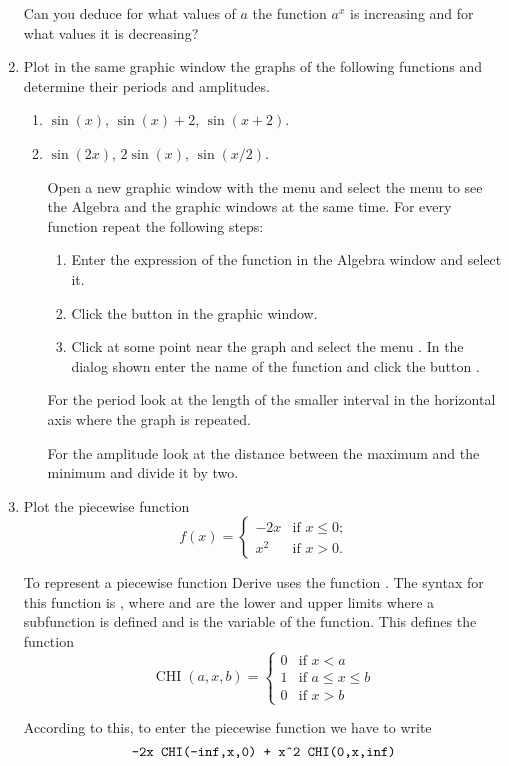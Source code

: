 \begin{enumerate}[leftmargin=*]
Can you deduce for what values of $a$ the function $a^x$ is increasing and for what values it is decreasing?


\item Plot in the same graphic window the graphs of the following functions and determine their periods and amplitudes. 
\begin{enumerate}
\item $\sin(x)$, $\sin(x)+2$, $\sin(x+2)$.
\item $\sin(2x)$, $2\sin(x)$, $\sin(x/2)$.
\begin{indication}
Open a new graphic window with the menu  and select the menu  to see the Algebra and the graphic windows at the same time. 
For every function repeat the following steps:
\begin{enumerate}
\item Enter the expression of the function in the Algebra window and select it. 
\item Click the button  in the graphic window.
\item Click at some point near the graph and select the menu . 
In the dialog shown enter the name of the function and click the button .
\end{enumerate}
For the period look at the length of the smaller interval in the horizontal axis where the graph is repeated. 

For the amplitude look at the distance between the maximum and the minimum and divide it by two.
\end{indication}
\end{enumerate}


\item Plot the piecewise function 
\[
f(x)=
\begin{cases}
-2x & \mbox{if $x\leq0$;} \\
x^2 & \mbox{if $x>0$.}
\end{cases}
\]

\begin{indication}
To represent a piecewise function Derive uses the function .
The syntax for this function is , where  and  are the lower and upper limits where a subfunction is defined and  is the variable of the function. 
This defines the function 
\[
\operatorname{CHI} (a,x,b) = 
\begin{cases}
0 & \mbox{if $x<a$} \\
1 & \mbox{if $a\leq x \leq b$} \\
0 & \mbox{if $x>b$}
 \end{cases}
\]

According to this, to enter the piecewise function we have to write  
\[
\texttt{-2x CHI(-inf,x,0) + x\^{}2 CHI(0,x,inf)}
\]
\end{indication}
\end{enumerate}



